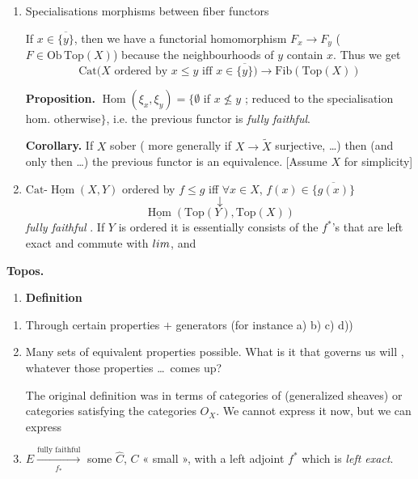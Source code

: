 \documentclass[11pt,a4paper]{article}
\begin{document}
\begin{enumerate}
\item[a)] Specialisations  morphisms between fiber functors

If $x \in \overline{\{y\}}$, then we have a functorial homomorphism
$F_{x} \to F_{y}$ ($F \in \mathrm{Ob}\,\mathrm{Top}(X)$) because the
neighbourhoods of $y$ contain $x$. Thus \struck{\ill{}} we get
\[
\mathrm{Cat}\bigl(X \text{ ordered by } x \leq y \text{ iff }
x \in \overline{\{y\}}\bigr) \longrightarrow \mathrm{Fib}(\mathrm{Top}(X))
\]

\textbf{Proposition.} $\operatorname{Hom}(\xi_{x}, \xi_{y}) =
\{\emptyset$ if $x \not\leq y$ ; reduced to the specialisation hom. otherwise$\}$,
i.e. the previous functor is \emph{fully faithful}.

\textbf{Corollary.} If $X$ sober ( more generally if
$X \to \widetilde{X}$ surjective, …) then (and only then …) the
previous functor is an equivalence. [Assume $X$ \struck{\ill{}} for simplicity]

\item[b)] $\mathrm{Cat}\text{-}\underline{\operatorname{Hom}}(X, Y)$ ordered by
$f \leq g$ iff $\forall x \in X$, $f(x) \in \overline{\{g(x)\}}$
\[
\downarrow
\]
\[
\underline{\operatorname{Hom}}(\mathrm{Top}(Y), \mathrm{Top}(X))
\]
\emph{fully faithful} \struck{\ill{}}. If $Y$ is ordered it is essentially
\ill{} consists of the $f^{*}$'s that are left exact and commute with
$\varprojlim$, and \struck{\ill{}}
\end{enumerate}




\textbf{Topos.}
\begin{enumerate}
\item[1)] \textbf{Definition}
\end{enumerate}

\begin{enumerate}
\item[a)] Through certain properties $+$ generators (for instance a) b) c) d))
\item[$*$] Many sets of equivalent  properties possible. What is
it \struck{\ill{}} that governs us will \ill{}, whatever those properties …\
comes up?

The original definition was in terms of categories of 
(generalized sheaves) or categories \ill{} satisfying \ill{} the categories
\struck{\ill{}} $O_{X}$. We cannot express it now, but we can express
\item[b)] $E \xrightarrow[f_{*}]{\text{fully faithful}}$ some $\widehat{C}$,
$C$ « small », with a left adjoint $f^{*}$ which is \emph{left exact}.
\end{enumerate}
\end{document}
